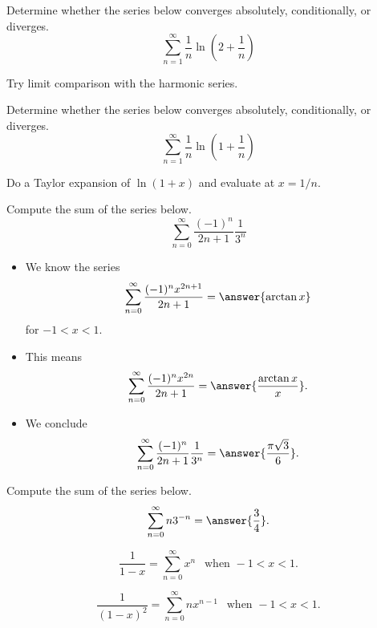 \documentclass{ximera}
\begin{document}
\begin{exercise}
Determine whether the series below converges absolutely, conditionally, or diverges.
\[ \sum_{n=1}^\infty \frac{1}{n} \ln \left(2 + \frac{1}{n} \right) \]
\begin{multipleChoice}
\end{multipleChoice}
\begin{hint}
Try limit comparison with the harmonic series.
\end{hint}
\end{exercise}
\begin{exercise}
Determine whether the series below converges absolutely, conditionally, or diverges.
\[ \sum_{n=1}^\infty \frac{1}{n} \ln \left(1 + \frac{1}{n} \right) \]
\begin{multipleChoice}
\end{multipleChoice}
\begin{hint}
Do a Taylor expansion of $\ln (1 + x)$ and evaluate at $x = 1/n$.
\end{hint}
\end{exercise}

\begin{exercise}
Compute the sum of the series below.
\[ \sum_{n=0}^\infty \frac{(-1)^n}{2n+1} \frac{1}{3^n} \]
\begin{itemize}
\item We know the series
\[ \sum_{n=0}^\infty \frac{(-1)^n x^{2n+1}}{2n+1} = \answer{\arctan x} \]
for $-1 < x < 1$. 
\item This means
\[ \sum_{n=0}^\infty \frac{(-1)^n x^{2n}}{2n+1} = \answer{\frac{\arctan x}{x}}. \]
\item We conclude
\[  \sum_{n=0}^\infty \frac{(-1)^n}{2n+1} \frac{1}{3^n} = \answer{\frac{\pi \sqrt{3}}{6}}. \]
\end{itemize}
\end{exercise}



\begin{exercise}
Compute the sum of the series below.
\[ \sum_{n=0}^\infty n 3^{-n} = \answer{\frac{3}{4}}. \]
\begin{hint}
\[ \frac{1}{1-x} = \sum_{n=0}^\infty x^n \ \ \text{ when } -1 < x < 1. \]
\end{hint}
\begin{hint}
\[ \frac{1}{(1-x)^2} = \sum_{n=0}^\infty n x^{n-1} \ \ \text{ when } -1 < x < 1. \]
\end{hint}
\end{exercise}
\end{document}
